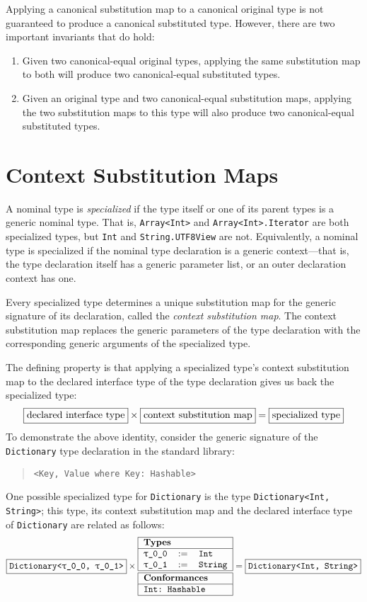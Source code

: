 \documentclass[a4paper,headsepline,bibliography=totoc,toc=flat,fleqn,twoside=semi]{scrbook}
\theoremstyle{definition}
\theoremstyle{definition}
\theoremstyle{definition}
\newcommand{\mathboxed}[1]{\boxed{\mbox{\vphantom{pI\texttt{pI}}#1}}}
\newcommand{\ttbox}[1]{\boxed{\mbox{\vphantom{pI\texttt{pI}}\texttt{#1}}}}
\newcommand{\ttgp}[2]{\texttt{$\uptau$\_#1\_#2}}
\newcommand{\SubMapC}[2]{\begin{tabular}{|lll|}
\hline
\multicolumn{3}{|l|}{\textbf{Types}}\\
\hline
#1\\
\hline
\hline
\multicolumn{3}{|l|}{\textbf{Conformances}}\\
\hline
#2\\
\hline
\end{tabular}}
\newcommand{\SubType}[2]{\texttt{#1}&$:=$&\texttt{#2}}
\newcommand{\SubConf}[1]{\multicolumn{3}{|l|}{\texttt{#1}}}
\begin{document}
Applying a canonical substitution map to a canonical original type is not guaranteed to produce a canonical substituted type. However, there are two important invariants that do hold:
\begin{enumerate}
\item Given two canonical-equal original types, applying the same substitution map to both will produce two canonical-equal substituted types.
\item Given an original type and two canonical-equal substitution maps, applying the two substitution maps to this type will also produce two canonical-equal substituted types.
\end{enumerate}

\section{Context Substitution Maps}\label{contextsubstmap}

A nominal type is \emph{specialized} if the type itself or one of its parent types is a generic nominal type. That is, \texttt{Array<Int>} and \texttt{Array<Int>.Iterator} are both specialized types, but \texttt{Int} and \texttt{String.UTF8View} are not. Equivalently, a nominal type is specialized if the nominal type declaration is a generic context---that is, the type declaration itself has a generic parameter list, or an outer declaration context has one.

Every specialized type determines a unique substitution map for the generic signature of its declaration, called the \emph{context substitution map}. The context substitution map replaces the generic parameters of the type declaration with the corresponding generic arguments of the specialized type.

The defining property is that applying a specialized type's context substitution map to the declared interface type of the type declaration gives us back the specialized type:
\[
\mathboxed{declared interface type}\times \mathboxed{context substitution map} = \mathboxed{specialized type}
\]
To demonstrate the above identity, consider the generic signature of the \texttt{Dictionary} type declaration in the standard library:
\begin{quote}
\texttt{<Key, Value where Key:\ Hashable>}
\end{quote}
One possible specialized type for \texttt{Dictionary} is the type \texttt{Dictionary<Int, String>}; this type, its context substitution map and the declared interface type of \texttt{Dictionary} are related as follows:
\[
\ttbox{Dictionary<\ttgp{0}{0}, \ttgp{0}{1}>}\times
\SubMapC{
\SubType{\ttgp{0}{0}}{Int}\\
\SubType{\ttgp{0}{1}}{String}
}{
\SubConf{Int:\ Hashable}
} = \ttbox{Dictionary<Int, String>}
\]
\end{document}
